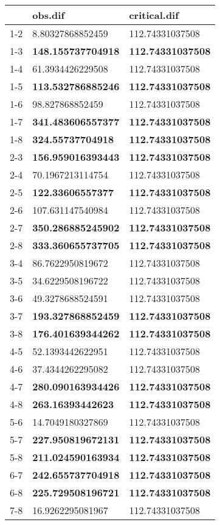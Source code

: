 \begin{table}[ht]
\centering
\begin{tabular}{rll}
  \hline
 & obs.dif & critical.dif \\ 
  \hline
1-2 & 8.80327868852459 & 112.74331037508 \\ 
  1-3 & \textbf{148.155737704918} & \textbf{112.74331037508} \\ 
  1-4 & 61.3934426229508 & 112.74331037508 \\ 
  1-5 & \textbf{113.532786885246} & \textbf{112.74331037508} \\ 
  1-6 & 98.827868852459 & 112.74331037508 \\ 
  1-7 & \textbf{341.483606557377} & \textbf{112.74331037508} \\ 
  1-8 & \textbf{324.55737704918} & \textbf{112.74331037508} \\ 
  2-3 & \textbf{156.959016393443} & \textbf{112.74331037508} \\ 
  2-4 & 70.1967213114754 & 112.74331037508 \\ 
  2-5 & \textbf{122.33606557377} & \textbf{112.74331037508} \\ 
  2-6 & 107.631147540984 & 112.74331037508 \\ 
  2-7 & \textbf{350.286885245902} & \textbf{112.74331037508} \\ 
  2-8 & \textbf{333.360655737705} & \textbf{112.74331037508} \\ 
  3-4 & 86.7622950819672 & 112.74331037508 \\ 
  3-5 & 34.6229508196722 & 112.74331037508 \\ 
  3-6 & 49.3278688524591 & 112.74331037508 \\ 
  3-7 & \textbf{193.327868852459} & \textbf{112.74331037508} \\ 
  3-8 & \textbf{176.401639344262} & \textbf{112.74331037508} \\ 
  4-5 & 52.1393442622951 & 112.74331037508 \\ 
  4-6 & 37.4344262295082 & 112.74331037508 \\ 
  4-7 & \textbf{280.090163934426} & \textbf{112.74331037508} \\ 
  4-8 & \textbf{263.16393442623} & \textbf{112.74331037508} \\ 
  5-6 & 14.7049180327869 & 112.74331037508 \\ 
  5-7 & \textbf{227.950819672131} & \textbf{112.74331037508} \\ 
  5-8 & \textbf{211.024590163934} & \textbf{112.74331037508} \\ 
  6-7 & \textbf{242.655737704918} & \textbf{112.74331037508} \\ 
  6-8 & \textbf{225.729508196721} & \textbf{112.74331037508} \\ 
  7-8 & 16.9262295081967 & 112.74331037508 \\ 
   \hline
\end{tabular}
\end{table}
